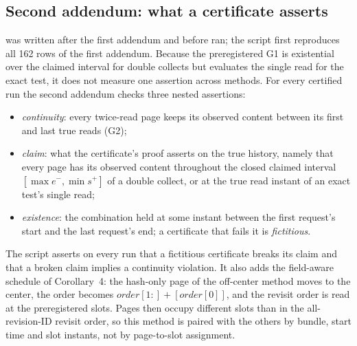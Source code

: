 \subsection{Second addendum: what a certificate asserts}
 was written after the first addendum and
before  ran; the script first reproduces all 162 rows of the
first addendum. Because the preregistered G1 is existential over the claimed
interval for double collects but evaluates the single read for the exact test,
it does not measure one assertion across methods. For every certified run the
second addendum checks three nested assertions:
\begin{itemize}
\item \emph{continuity}: every twice-read page keeps its observed content
between its first and last true reads (G2);
\item \emph{claim}: what the certificate's proof asserts on the true history,
namely that every page has its observed content throughout the closed claimed
interval $[\max e^-,\min s^+]$ of a double collect, or at the true read
instant of an exact test's single read;
\item \emph{existence}: the combination held at some instant between the first
request's start and the last request's end; a certificate that fails it is
\emph{fictitious}.
\end{itemize}
The script asserts on every run that a fictitious certificate breaks its claim
and that a broken claim implies a continuity violation. It also adds the
field-aware schedule of Corollary~4: the hash-only page of the off-center
method moves to the center, the order becomes
$\mathit{order}[1{:}]+[\mathit{order}[0]]$, and the revisit order is read at the
preregistered slots. Pages then occupy different slots than in the
all-revision-ID revisit order, so this method is paired with the others by
bundle, start time and slot instants, not by page-to-slot assignment.

\begin{table}[t]
\caption{The three nested assertions per method: certified runs and runs that break continuity, their claim, the preregistered G1, and existence (fictitious). Left: totals over both strata, $n=2,4,8$ and the three gaps. Right: eight vital pages with request starts 1\,h apart, the condition of Figure~2b. $^{\ast}$Preregistered.}
\label{tab:assertions}
\small
\setlength{\tabcolsep}{4.5pt}

\end{table}

